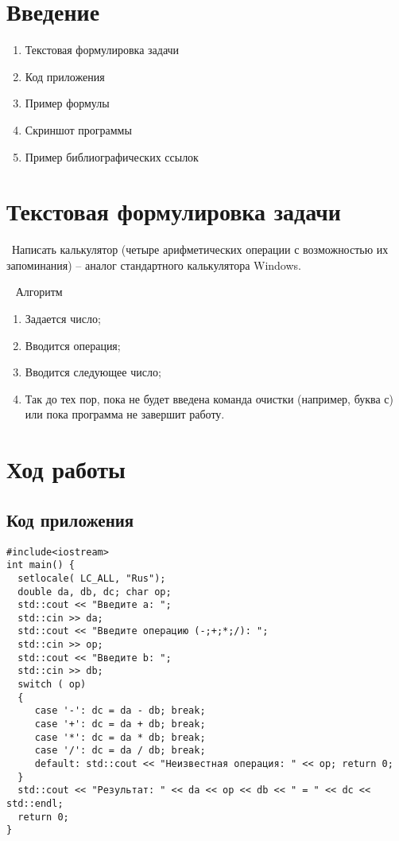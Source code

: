 \documentclass[12pt,a4paper]{scrartcl}
\begin{document}
\section{Введение}
\label{sec:intro}


\begin{enumerate}
 \item Текстовая формулировка задачи
 \item Код приложения
 \item Пример формулы
 \item Скриншот программы
 \item Пример библиографических ссылок
\end{enumerate}



\section{Текстовая формулировка задачи}
\label{sec:exp}
 \ {Написать калькулятор (четыре арифметических операции с возможностью их запоминания) – аналог стандартного калькулятора Windows.}
 
\    {    Алгоритм}
\begin{enumerate}
\item 	Задается число;
\item	Вводится операция;
\item	Вводится следующее число;
\item	Так до тех пор, пока не будет введена команда очистки (например, буква с) или пока программа не завершит работу.
\end{enumerate}



\section{Ход работы}
\label{sec:exp}

\subsection{Код приложения}
\label{sec:exp:code}
\begin{verbatim}
#include<iostream>
int main() {
  setlocale( LC_ALL, "Rus");
  double da, db, dc; char op;
  std::cout << "Введите а: ";
  std::cin >> da;
  std::cout << "Введите операцию (-;+;*;/): ";
  std::cin >> op;
  std::cout << "Введите b: ";
  std::cin >> db;
  switch ( op)
  {
     case '-': dc = da - db; break;
     case '+': dc = da + db; break;
     case '*': dc = da * db; break;
     case '/': dc = da / db; break;
     default: std::cout << "Неизвестная операция: " << op; return 0;
  }
  std::cout << "Результат: " << da << op << db << " = " << dc << std::endl;
  return 0;
}
\end{verbatim}
\end{document}

